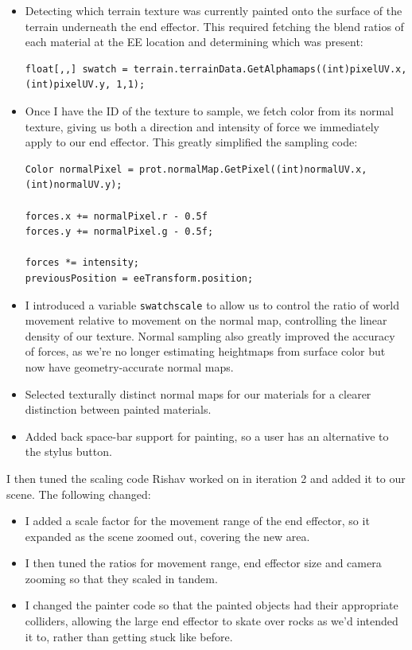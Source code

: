 \begin{itemize}
    \item Detecting which terrain texture was currently painted onto the surface of the terrain underneath the end effector. This required fetching the blend ratios of each material at the EE location and determining which was present:

          \begin{verbatim}
float[,,] swatch = terrain.terrainData.GetAlphamaps((int)pixelUV.x, (int)pixelUV.y, 1,1);
\end{verbatim}

    \item Once I have the ID of the texture to sample, we fetch color from its normal texture, giving us both a direction and intensity of force we immediately apply to our end effector. This greatly simplified the sampling code:

          \begin{verbatim}
Color normalPixel = prot.normalMap.GetPixel((int)normalUV.x, (int)normalUV.y);

forces.x += normalPixel.r - 0.5f
forces.y += normalPixel.g - 0.5f;

forces *= intensity;
previousPosition = eeTransform.position;
\end{verbatim}

    \item  I introduced a variable \texttt{swatchscale} to allow us to control the ratio of world movement relative to movement on the normal map, controlling the linear density of our texture. Normal sampling also greatly improved the accuracy of forces, as we’re no longer estimating heightmaps from surface color but now have geometry-accurate normal maps.
    \item  Selected texturally distinct normal maps for our materials for a clearer distinction between painted materials.
    \item  Added back space-bar support for painting, so a user has an alternative to the stylus button.
\end{itemize}

I then tuned the scaling code Rishav worked on in iteration 2 and added it to our scene. The following changed:

\begin{itemize}
    \item I added a scale factor for the movement range of the end effector, so it expanded as the scene zoomed out, covering the new area.
    \item I then tuned the ratios for movement range, end effector size and camera zooming so that they scaled in tandem.
    \item I changed the painter code so that the painted objects had their appropriate colliders, allowing the large end effector to skate over rocks as we’d intended it to, rather than getting stuck like before.
\end{itemize}

